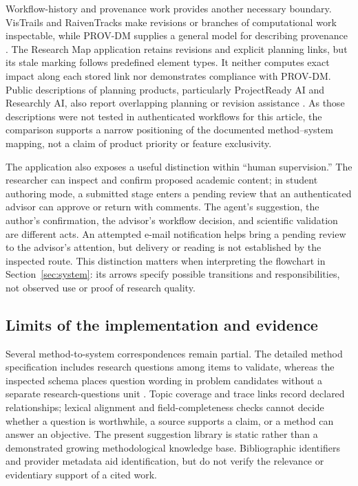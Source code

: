 Workflow-history and provenance work provides another necessary boundary. VisTrails and RaivenTracks make revisions or branches of computational work inspectable, while PROV-DM supplies a general model for describing provenance \cite{freire2006vistrails,hugie2026raiventracks,moreau2013prov}. The Research Map application retains revisions and explicit planning links, but its stale marking follows predefined element types. It neither computes exact impact along each stored link nor demonstrates compliance with PROV-DM. Public descriptions of planning products, particularly ProjectReady AI and Researchly AI, also report overlapping planning or revision assistance \cite{projectready2026guide,researchly2026site}. As those descriptions were not tested in authenticated workflows for this article, the comparison supports a narrow positioning of the documented method--system mapping, not a claim of product priority or feature exclusivity.

The application also exposes a useful distinction within ``human supervision.'' The researcher can inspect and confirm proposed academic content; in student authoring mode, a submitted stage enters a pending review that an authenticated advisor can approve or return with comments. The agent's suggestion, the author's confirmation, the advisor's workflow decision, and scientific validation are different acts. An attempted e-mail notification helps bring a pending review to the advisor's attention, but delivery or reading is not established by the inspected route. This distinction matters when interpreting the flowchart in Section~\ref{sec:system}: its arrows specify possible transitions and responsibilities, not observed use or proof of research quality.

\subsection{Limits of the implementation and evidence}

Several method-to-system correspondences remain partial. The detailed method specification includes research questions among items to validate, whereas the inspected schema places question wording in problem candidates without a separate research-questions unit \cite{franca2026detail}. Topic coverage and trace links record declared relationships; lexical alignment and field-completeness checks cannot decide whether a question is worthwhile, a source supports a claim, or a method can answer an objective. The present suggestion library is static rather than a demonstrated growing methodological knowledge base. Bibliographic identifiers and provider metadata aid identification, but do not verify the relevance or evidentiary support of a cited work.

